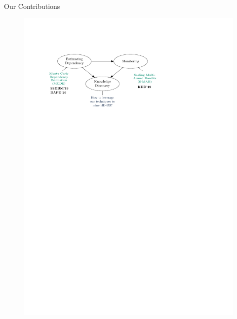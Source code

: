 \documentclass[16pt,usenames,dvipsnames, notheorems]{beamer}
\theoremstyle{definition}
\theoremstyle{example}
\theoremstyle{plain}
\begin{document}
\begin{frame}{Our Contributions}
\begin{figure}
\begin{overprint}
		 \includegraphics[width=1.0 \linewidth]{figures/outline_c_7-compressed.pdf}

\end{overprint}
\end{figure}
\end{frame}
\end{document}
